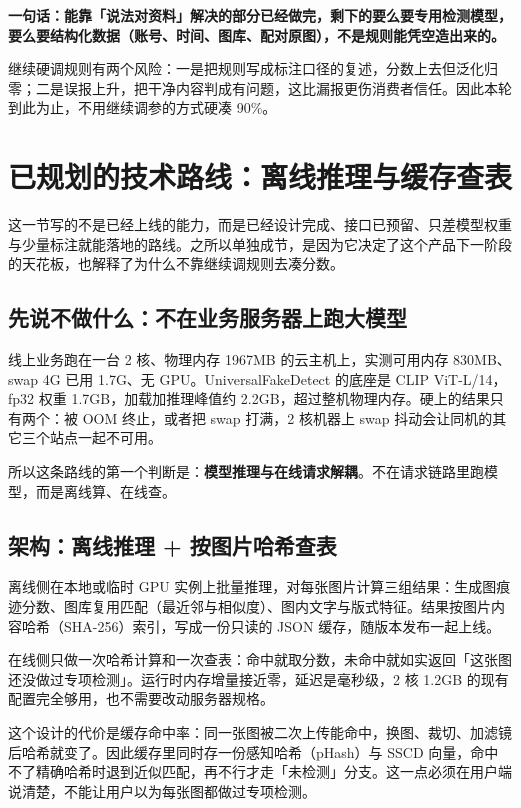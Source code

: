 \documentclass[11pt]{ctexart}
\begin{document}
\textbf{一句话：能靠「说法对资料」解决的部分已经做完，剩下的要么要专用检测模型，要么要结构化数据（账号、时间、图库、配对原图），不是规则能凭空造出来的。}

继续硬调规则有两个风险：一是把规则写成标注口径的复述，分数上去但泛化归零；二是误报上升，把干净内容判成有问题，这比漏报更伤消费者信任。因此本轮到此为止，不用继续调参的方式硬凑 90\%。

\section{已规划的技术路线：离线推理与缓存查表}

这一节写的不是已经上线的能力，而是已经设计完成、接口已预留、只差模型权重与少量标注就能落地的路线。之所以单独成节，是因为它决定了这个产品下一阶段的天花板，也解释了为什么不靠继续调规则去凑分数。

\subsection{先说不做什么：不在业务服务器上跑大模型}

线上业务跑在一台 2 核、物理内存 1967MB 的云主机上，实测可用内存 830MB、swap 4G 已用 1.7G、无 GPU。UniversalFakeDetect 的底座是 CLIP ViT-L/14，fp32 权重 1.7GB，加载加推理峰值约 2.2GB，超过整机物理内存。硬上的结果只有两个：被 OOM 终止，或者把 swap 打满，2 核机器上 swap 抖动会让同机的其它三个站点一起不可用。

所以这条路线的第一个判断是：\textbf{模型推理与在线请求解耦}。不在请求链路里跑模型，而是离线算、在线查。

\subsection{架构：离线推理 + 按图片哈希查表}

离线侧在本地或临时 GPU 实例上批量推理，对每张图片计算三组结果：生成图痕迹分数、图库复用匹配（最近邻与相似度）、图内文字与版式特征。结果按图片内容哈希（SHA-256）索引，写成一份只读的 JSON 缓存，随版本发布一起上线。

在线侧只做一次哈希计算和一次查表：命中就取分数，未命中就如实返回「这张图还没做过专项检测」。运行时内存增量接近零，延迟是毫秒级，2 核 1.2GB 的现有配置完全够用，也不需要改动服务器规格。

这个设计的代价是缓存命中率：同一张图被二次上传能命中，换图、裁切、加滤镜后哈希就变了。因此缓存里同时存一份感知哈希（pHash）与 SSCD 向量，命中不了精确哈希时退到近似匹配，再不行才走「未检测」分支。这一点必须在用户端说清楚，不能让用户以为每张图都做过专项检测。
\end{document}
